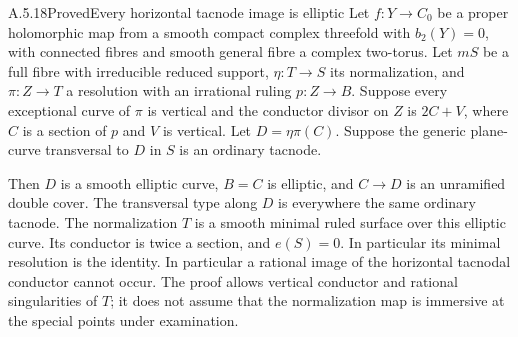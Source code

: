
\begin{statement}{A.5.18}{Proved}{Every horizontal tacnode image is elliptic}
Let $f:Y\to C_0$ be a proper holomorphic map from a smooth
compact complex threefold with $b_2(Y)=0$, with connected
fibres and smooth general fibre a complex two-torus.
Let $mS$ be a full fibre with irreducible reduced support,
$\eta:T\to S$ its normalization, and $\pi:Z\to T$ a
resolution with an irrational ruling $p:Z\to B$.
Suppose every exceptional curve of $\pi$ is vertical and
the conductor divisor on $Z$ is $2C+V$, where $C$ is a
section of $p$ and $V$ is vertical. Let $D=\eta\pi(C)$.
Suppose the generic plane-curve transversal to $D$ in $S$ is an
ordinary tacnode.

Then $D$ is a smooth elliptic curve, $B=C$ is elliptic,
and $C\to D$ is an unramified double cover. The transversal
type along $D$ is everywhere the same ordinary tacnode.
The normalization $T$ is a smooth minimal ruled surface
over this elliptic curve. Its conductor is twice a
section, and $e(S)=0$. In particular its minimal
resolution is the identity.
In particular a rational image of
the horizontal tacnodal conductor cannot occur. The proof
allows vertical conductor and rational singularities of
$T$; it does not assume that the normalization map is
immersive at the special points under examination.
\end{statement}
